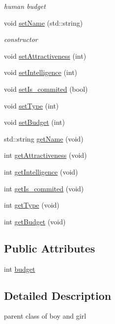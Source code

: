 \begin{DoxyCompactItemize}
\begin{DoxyCompactList}\small\item\em human budget \end{DoxyCompactList}\item 
void \hyperlink{classhomosapien_a0b0de2b72513ee20ba408ea29865e5f4}{set\+Name} (std\+::string)
\begin{DoxyCompactList}\small\item\em constructor \end{DoxyCompactList}\item 
void \hyperlink{classhomosapien_a264fd071fc5a6efda03730c34bfbc49c}{set\+Attractiveness} (int)
\item 
void \hyperlink{classhomosapien_adcfb3c7207fd77965679df8b85e5a507}{set\+Intelligence} (int)
\item 
void \hyperlink{classhomosapien_afee55d18c833bdfeac7392843e8580cc}{set\+Is\+\_\+commited} (bool)
\item 
void \hyperlink{classhomosapien_aa868001c96c4c26e5cbe85d7d75c738e}{set\+Type} (int)
\item 
void \hyperlink{classhomosapien_a3ad8cc4965cf29863337d0d56ca87d2d}{set\+Budget} (int)
\item 
std\+::string \hyperlink{classhomosapien_a1e93a89a2490a563289e7ad7a295ff45}{get\+Name} (void)
\item 
int \hyperlink{classhomosapien_a36bfd2262341cc01977ee077a7e5f619}{get\+Attractiveness} (void)
\item 
int \hyperlink{classhomosapien_ab9aa094786987a968b9a156a6d038931}{get\+Intelligence} (void)
\item 
int \hyperlink{classhomosapien_a3264f22c6b40fd138286980a7bafd11e}{get\+Is\+\_\+commited} (void)
\item 
int \hyperlink{classhomosapien_a2157c9d5eeb763c5fde1f42f4a6bb48b}{get\+Type} (void)
\item 
int \hyperlink{classhomosapien_a372c40e87592045235e89956ddda2488}{get\+Budget} (void)
\end{DoxyCompactItemize}
\subsection*{Public Attributes}
\begin{DoxyCompactItemize}
\item 
int \hyperlink{classhomosapien_a8e16a7132ce68bb9026113200f7599ad}{budget}
\end{DoxyCompactItemize}


\subsection{Detailed Description}
parent class of boy and girl 

